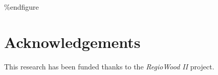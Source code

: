 \documentclass[3p,times]{elsarticle}
\begin{document}
\%end{figure}

\section{Acknowledgements}

This research has been funded thanks to the \textit{RegioWood II} project.



\end{document}
